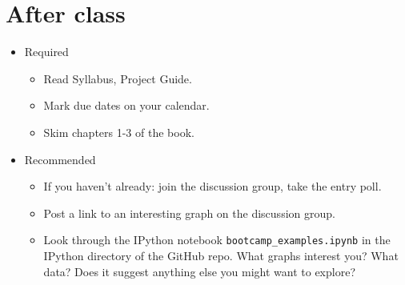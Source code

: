 \documentclass[11pt]{article}
\begin{document}
\section*{After class}

\begin{itemize}
\item Required
\begin{itemize}
\item Read Syllabus, Project Guide.
\item Mark due dates on your calendar.
\item Skim chapters 1-3 of the book.
\end{itemize} 
\item Recommended    
\begin{itemize}
\item If you haven't already:  join the discussion group, take the entry poll.
\item Post a link to an interesting graph on the discussion group.
\item Look through the IPython notebook \verb|bootcamp_examples.ipynb|
in the IPython directory of the GitHub repo.
What graphs interest you?  What data?  
Does it suggest anything else you might want to explore?
\end{itemize}
\end{itemize}
\end{document}
